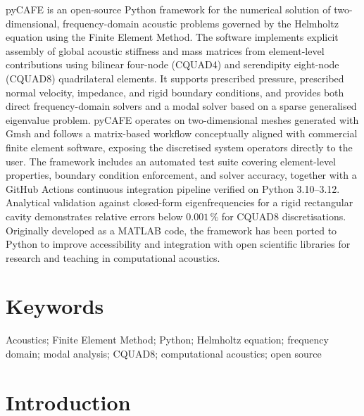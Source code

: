 \documentclass{jors}
\begin{document}
pyCAFE is an open-source Python framework for the numerical solution of two-dimensional, frequency-domain acoustic problems governed by the Helmholtz equation using the Finite Element Method. The software implements explicit assembly of global acoustic stiffness and mass matrices from element-level contributions using bilinear four-node (CQUAD4) and serendipity eight-node (CQUAD8) quadrilateral elements. It supports prescribed pressure, prescribed normal velocity, impedance, and rigid boundary conditions, and provides both direct frequency-domain solvers and a modal solver based on a sparse generalised eigenvalue problem. pyCAFE operates on two-dimensional meshes generated with Gmsh and follows a matrix-based workflow conceptually aligned with commercial finite element software, exposing the discretised system operators directly to the user. The framework includes an automated test suite covering element-level properties, boundary condition enforcement, and solver accuracy, together with a GitHub Actions continuous integration pipeline verified on Python 3.10--3.12. Analytical validation against closed-form eigenfrequencies for a rigid rectangular cavity demonstrates relative errors below $0.001\,\%$ for CQUAD8 discretisations. Originally developed as a MATLAB code, the framework has been ported to Python to improve accessibility and integration with open scientific libraries for research and teaching in computational acoustics.

\section*{Keywords}

Acoustics; Finite Element Method; Python; Helmholtz equation; frequency domain; modal analysis; CQUAD8; computational acoustics; open source

\section*{Introduction}
\end{document}

